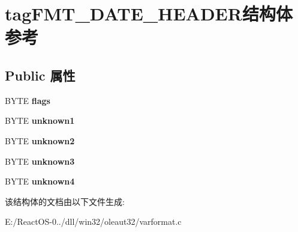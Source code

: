 \hypertarget{structtag_f_m_t___d_a_t_e___h_e_a_d_e_r}{}\section{tag\+F\+M\+T\+\_\+\+D\+A\+T\+E\+\_\+\+H\+E\+A\+D\+E\+R结构体 参考}
\label{structtag_f_m_t___d_a_t_e___h_e_a_d_e_r}
\subsection*{Public 属性}
\begin{DoxyCompactItemize}
\item 
\mbox{\label{structtag_f_m_t___d_a_t_e___h_e_a_d_e_r_af6ac36e40d270c23f2e7dafd5eda18b0}} 
B\+Y\+TE {\bfseries flags}
\item 
\mbox{\label{structtag_f_m_t___d_a_t_e___h_e_a_d_e_r_a17ab57055828df5cb370e5ad94b4a5b1}} 
B\+Y\+TE {\bfseries unknown1}
\item 
\mbox{\label{structtag_f_m_t___d_a_t_e___h_e_a_d_e_r_a9573e4fbd79251c3ce4f96373202b807}} 
B\+Y\+TE {\bfseries unknown2}
\item 
\mbox{\label{structtag_f_m_t___d_a_t_e___h_e_a_d_e_r_acd49686efcc2e34440a2c2875b5bb1bd}} 
B\+Y\+TE {\bfseries unknown3}
\item 
\mbox{\label{structtag_f_m_t___d_a_t_e___h_e_a_d_e_r_a90b018e9363b8ad622105daae23c6c48}} 
B\+Y\+TE {\bfseries unknown4}
\end{DoxyCompactItemize}


该结构体的文档由以下文件生成\+:\begin{DoxyCompactItemize}
\item 
E\+:/\+React\+O\+S-\/0../dll/win32/oleaut32/varformat.\+c\end{DoxyCompactItemize}
